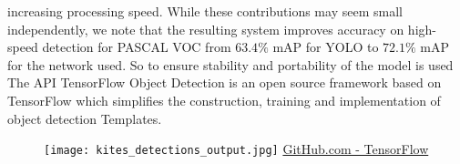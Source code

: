 increasing processing speed. While these contributions may seem small
independently, we note that the resulting system improves accuracy on high-speed
detection for PASCAL VOC from $63.4\%$ mAP for YOLO to $72.1\%$ mAP for the
network used.\cite{liu2016ssd,Huang2016SpeedAccuracyTF}
So to ensure stability and portability of the model is used The API TensorFlow
Object Detection is an open source framework based on TensorFlow which
simplifies the construction, training and implementation of object detection
Templates.\cite{objectdetectionAPI}
%
%
\begin{figure}[!h]
	\centering
	\texttt{[image: kites\_detections\_output.jpg]}
	{\href{https://github.com/tensorflow/models/tree/master/research/object_detection}{GitHub.com - TensorFlow}}
	\label{fig:kites-detections-output}
\end{figure}
%
%
